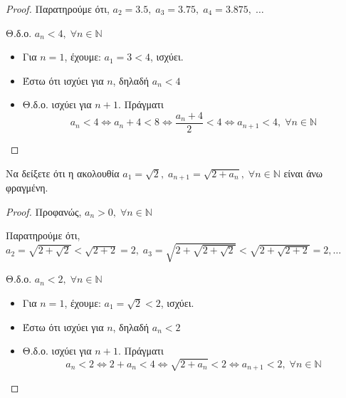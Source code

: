 \begin{enumerate}
\begin{proof}
            Παρατηρούμε ότι, $ a_{2}=3.5, \; a_{3}=3.75, \; a_{4}=3.875, \; 
            \ldots $

            Θ.δ.ο. $ a_{n} < 4, \; \forall n \in \mathbb{N} $ 
            \begin{itemize}
                \item Για $ n=1 $, έχουμε: $ a_{1}=3 < 4 $, ισχύει.
                \item Έστω ότι ισχύει για $n$, δηλαδή $ a_{n} < 4 $
                \item Θ.δ.ο. ισχύει για $ n+1 $. Πράγματι
                    \[
                        a_{n}<4 \Leftrightarrow a_{n}+4 < 8 \Leftrightarrow 
                        \frac{a_{n}+4}{2} < 4 \Leftrightarrow a_{n+1} <4, \; 
                        \forall n \in \mathbb{N} 
                    \] 
            \end{itemize}
        \end{proof}

    \item Να δείξετε ότι η ακολουθία $ a_{1} = \sqrt{2}, \; a_{n+1} =
        \sqrt{2+ a_{n}}, \; \forall n \in \mathbb{N} $ είναι άνω φραγμένη.

        \begin{proof}
        \item {}
            Προφανώς, $ a_{n} > 0, \; \forall n \in \mathbb{N} $ 

            Παρατηρούμε ότι, $ a_{2}= \sqrt{2 + \sqrt{2}} < \sqrt{2+2} =2, \; 
            a_{3}= \sqrt{2+ \sqrt{2 + \sqrt{2}}} < \sqrt{2+ \sqrt{2+2}} = 2, 
            \ldots $ 

            Θ.δ.ο. $ a_{n} < 2, \; \forall n \in \mathbb{N} $ 
            \begin{itemize}
                \item Για $ n=1 $, έχουμε: $ a_{1}= \sqrt{2} < 2 $, ισχύει.
                \item Έστω ότι ισχύει για $n$, δηλαδή $ a_{n} < 2 $
                \item Θ.δ.ο. ισχύει για $ n+1 $. Πράγματι
                    \[
                        a_{n}<2 \Leftrightarrow 2+a_{n} < 4 \Leftrightarrow 
                        \sqrt{2+ a_{n}} < 2\Leftrightarrow a_{n+1} <2, \; 
                        \forall n \in \mathbb{N} 
                    \] 
            \end{itemize}
        \end{proof}




\end{enumerate}
